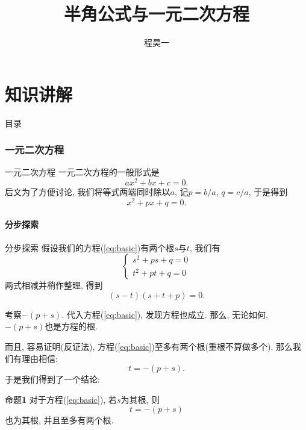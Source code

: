 \documentclass[serif]{beamer}
\title{\textbf{\heiti 半角公式与一元二次方程}}
\author{\kaishu 程昊一}
\begin{document}
\begin{frame}
	\maketitle
\end{frame}

\part{\heiti\hspace*{\fill}\hspace*{3cm}知\hspace{\fill}识\hspace{\fill}讲\hspace{\fill}解\hspace{\fill}\hspace{3cm}}

\begin{frame}
	\partpage
\end{frame}

\begin{frame}{\heiti 目录}
	\tableofcontents
\end{frame}

\section{\heiti 一元二次方程}

\begin{frame}{\heiti 一元二次方程}
	一元二次方程的一般形式是
	\[ax^2+bx+c=0.\]
	后文为了方便讨论, 我们将等式两端同时除以$a$, 记$p=b/a$, $q=c/a$, 于是得到
	\begin{equation}
		x^2+px+q=0.\label{eq:basic}
	\end{equation}
\end{frame}

\subsection{\kaishu 分步探索}

\begin{frame}{\kaishu 分步探索}
	假设我们的方程(\ref{eq:basic})有两个根$s$与$t$, 我们有
	\[\begin{cases}
		s^2+ps+q=0\\
		t^2+pt+q=0
	\end{cases}\]
	两式相减并稍作整理, 得到
	\[(s-t)(s+t+p)=0.\]
\end{frame}

\begin{frame}
	考察$-(p+s)$. 代入方程(\ref{eq:basic}), 发现方程也成立. 那么, 无论如何, $-(p+s)$也是方程的根.\par
	而且, 容易证明(反证法), 方程(\ref{eq:basic})至多有两个根(重根不算做多个). 那么我们有理由相信:
	\[t=-(p+s).\]
	于是我们得到了一个结论:
	\begin{block}{{\heiti 命题}\textbf{1}}
		\kaishu
		对于方程(\ref{eq:basic}), 若$s$为其根, 则
		\[t=-(p+s)\]
		也为其根, 并且至多有两个根.
	\end{block}
\end{frame}
\end{document}
